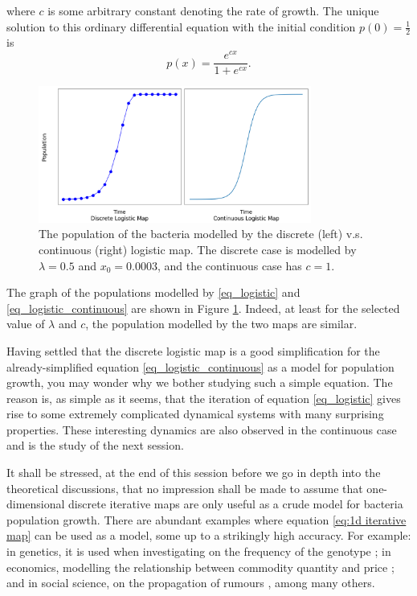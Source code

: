 where $c$ is some arbitrary constant denoting the rate of growth. 
The unique solution to this ordinary differential equation with the initial condition $p(0) = \frac{1}{2}$ is 
$$
p(x) = \frac{e^{cx}}{1+e^{cx}}.
$$
\begin{figure}
	\centering
	\includegraphics[width=0.8\textwidth]{./figures/con_vs_discrete_logistic_map.png}
	\caption{The population of the bacteria modelled by the discrete (left) v.s. continuous (right) logistic map. 
	The discrete case is modelled by $\lambda = 0.5$ and $x_0 = 0.0003$, and the continuous case has $c=1$.}
	\label{fig:con_vs_discrete}
\end{figure}
The graph of the populations modelled by \eqref{eq_logistic} and \eqref{eq_logistic_continuous} are shown in Figure \ref{fig:con_vs_discrete}.
Indeed, at least for the selected value of $\lambda$ and $c$, the population modelled by the two maps are similar.

Having settled that the discrete logistic map is a good simplification for the already-simplified equation \eqref{eq_logistic_continuous} as a model for population growth, you may wonder why we bother studying such a simple equation. 
The reason is, as simple as it seems, that the iteration of equation \eqref{eq_logistic} gives rise to some extremely complicated dynamical systems with many surprising properties. 
These interesting dynamics are also observed in the continuous case and is the study of the next session.

It shall be stressed, at the end of this session before we go in depth into the theoretical discussions, that no impression shall be made to assume that one-dimensional discrete iterative maps are only useful as a crude model for bacteria population growth. 
There are abundant examples where equation \eqref{eq:1d iterative map} can be used as a model, some up to a strikingly high accuracy. 
For example: in genetics, it is used when investigating on the frequency of the genotype \cite{genotype}; in economics, modelling the relationship between commodity quantity and price \cite{economics}; and in social science, on the propagation of rumours \cite{social_science}, among many others.


